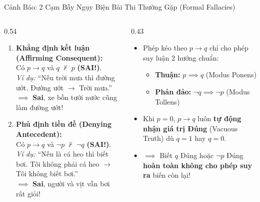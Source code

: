 \documentclass[aspectratio=169, 10pt]{beamer}
\begin{document}
\begin{frame}{Cảnh Báo: 2 Cạm Bẫy Ngụy Biện Bài Thi Thường Gặp (Formal Fallacies)}
  \begin{columns}[t, onlytextwidth]
    \begin{column}{0.54\textwidth}
      \begin{cozyTrap}
        \small
        \begin{enumerate}
          \setlength{\itemsep}{2.5pt}
          \item \textbf{Khẳng định kết luận (Affirming Consequent):}\\
          Có $p \to q$ và $q \;\not\vdash\; p$ \textbf{\textcolor{cozyFalse}{(SAI!)}}.\\
          \textit{Ví dụ:} ``Nếu trời mưa thì đường ướt. Đường ướt $\to$ Trời mưa.''\\
          $\implies$ \textbf{Sai}, xe bồn tưới nước cũng làm đường ướt!
          \item \textbf{Phủ định tiền đề (Denying Antecedent):}\\
          Có $p \to q$ và $\neg p \;\not\vdash\; \neg q$ \textbf{\textcolor{cozyFalse}{(SAI!)}}.\\
          \textit{Ví dụ:} ``Nếu là cá heo thì biết bơi. Tôi không phải cá heo $\to$ Tôi không biết bơi.''\\
          $\implies$ \textbf{Sai}, người và vịt vẫn bơi rất giỏi!
        \end{enumerate}
      \end{cozyTrap}
    \end{column}
    \begin{column}{0.43\textwidth}
      \begin{cozyInsight}
        \small
        \begin{itemize}
          \setlength{\itemsep}{2pt}
          \item Phép kéo theo $p \to q$ chỉ cho phép suy luận 2 hướng chuẩn:
          \begin{itemize}
            \item \textbf{Thuận:} $p \implies q$ (Modus Ponens)
            \item \textbf{Phản đảo:} $\neg q \implies \neg p$ (Modus Tollens)
          \end{itemize}
          \item Khi $p = 0$, $p \to q$ luôn \textbf{tự động nhận giá trị Đúng} (Vacuous Truth) dù $q = 1$ hay $q = 0$.
          \item $\implies$ Biết $q$ Đúng hoặc $\neg p$ Đúng \textbf{hoàn toàn không cho phép suy ra} biến còn lại!
        \end{itemize}
      \end{cozyInsight}
    \end{column}
  \end{columns}
\end{frame}
\end{document}

